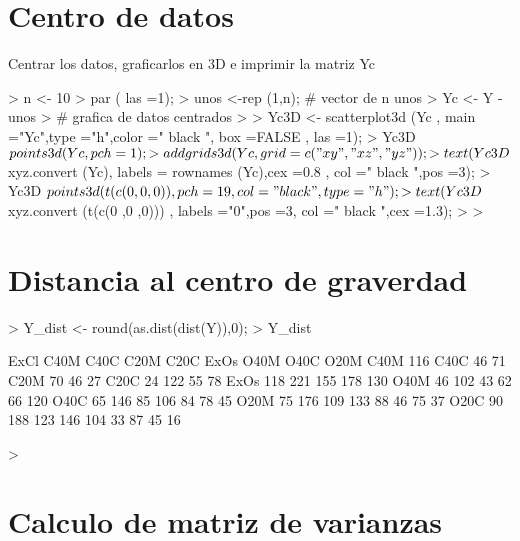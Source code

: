 \documentclass{article}
\begin{document}
\section{Centro de datos}
Centrar los datos, graficarlos en 3D e imprimir la matriz Yc

\begin{Schunk}
\begin{Sinput}
> n <- 10
> par ( las =1);
> unos <-rep (1,n); # vector de n unos
> Yc <- Y - unos%*%t(g); 
> # grafica de datos centrados
> 
> Yc3D <- scatterplot3d (Yc , main ="Yc",type ="h",color =" black ", box =FALSE , las =1);
> Yc3D$points3d (Yc , pch =1);
> addgrids3d (Yc , grid =c("xy", "xz", "yz" ));
> text ( Yc3D$xyz.convert (Yc), labels = rownames (Yc),cex =0.8 , col =" black ",pos =3);
> Yc3D $ points3d (t(c(0 ,0 ,0)) , pch =19 , col =" black ",type = "h");
> text ( Yc3D$xyz.convert (t(c(0 ,0 ,0))) , labels ="0",pos =3, col =" black ",cex =1.3);
> 
> 
\end{Sinput}
\end{Schunk}

\section{Distancia al centro de graverdad}

\begin{Schunk}
\begin{Sinput}
> Y_dist <- round(as.dist(dist(Y)),0);
> Y_dist
\end{Sinput}
\begin{Soutput}
     ExCl C40M C40C C20M C20C ExOs O40M O40C O20M
C40M  116                                        
C40C   46   71                                   
C20M   70   46   27                              
C20C   24  122   55   78                         
ExOs  118  221  155  178  130                    
O40M   46  102   43   62   66  120               
O40C   65  146   85  106   84   78   45          
O20M   75  176  109  133   88   46   75   37     
O20C   90  188  123  146  104   33   87   45   16
\end{Soutput}
\begin{Sinput}
> 
\end{Sinput}
\end{Schunk}

\section{Calculo de matriz de varianzas}
\end{document}
